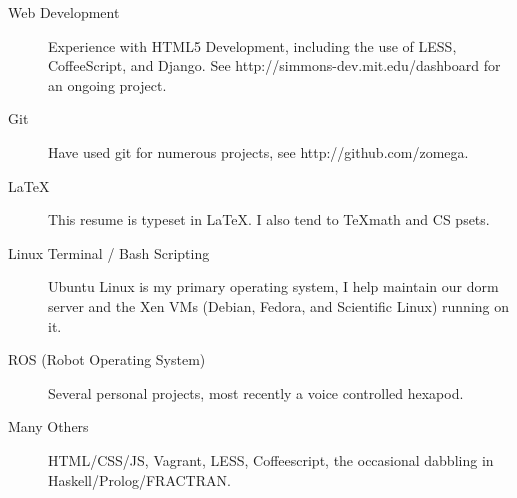 \documentclass{res}
\begin{document}
\begin{resume}
\begin{description}
				\item[Web Development] Experience with HTML5 Development, including the use of LESS, CoffeeScript, and Django. See http://simmons-dev.mit.edu/dashboard for an ongoing project.

				\item[Git] Have used git for numerous projects, see http://github.com/zomega.

				\item[\LaTeX] This resume is typeset in \LaTeX. I also tend to \TeX \space math and CS psets.

				\item[Linux Terminal / Bash Scripting] Ubuntu Linux is my primary operating system, I help maintain our dorm server and the Xen VMs (Debian, Fedora, and Scientific Linux) running on it.

				\item[ROS (Robot Operating System)] Several personal projects, most recently a voice controlled hexapod.
				
				\item[Many Others] HTML/CSS/JS, Vagrant, LESS, Coffeescript, the occasional dabbling in Haskell/Prolog/FRACTRAN. 

			\end{description}
	\end{resume}
\end{document}
